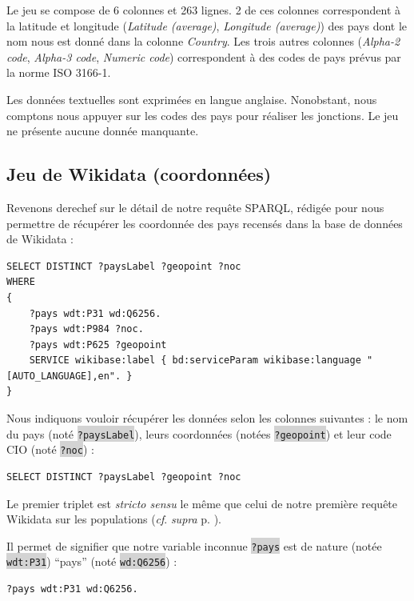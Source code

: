 \documentclass[hidelinks, 12pt]{report}
\newcommand{\code}[1]{\colorbox{LightGray}{\texttt{#1}}}
\begin{document}
Le jeu se compose de 6 colonnes et 263 lignes. 2 de ces colonnes correspondent à la latitude et longitude (\textit{Latitude (average)}, \textit{Longitude (average)}) des pays dont le nom nous est donné dans la colonne \textit{Country}. Les trois autres colonnes (\textit{Alpha-2 code}, \textit{Alpha-3 code}, \textit{Numeric code}) correspondent à des codes de pays prévus par la norme ISO 3166-1.

Les données textuelles sont exprimées en langue anglaise. Nonobstant, nous comptons nous appuyer sur les codes des pays pour réaliser les jonctions. Le jeu ne présente aucune donnée manquante. 





%





\subsection{Jeu de Wikidata (coordonnées)}

Revenons derechef sur le détail de notre requête SPARQL, rédigée pour nous permettre de récupérer les coordonnée des pays recensés dans la base de données de Wikidata :

\begin{lstlisting}[language=SPARQL]
SELECT DISTINCT ?paysLabel ?geopoint ?noc
WHERE 
{
	?pays wdt:P31 wd:Q6256.
	?pays wdt:P984 ?noc.
	?pays wdt:P625 ?geopoint
	SERVICE wikibase:label { bd:serviceParam wikibase:language "[AUTO_LANGUAGE],en". }
}
\end{lstlisting}

Nous indiquons vouloir récupérer les données selon les colonnes suivantes : le nom du pays (noté \code{?paysLabel}), leurs coordonnées (notées \code{?geopoint}) et leur code CIO (noté \code{?noc}) :

\begin{lstlisting}[language=SPARQL]
	SELECT DISTINCT ?paysLabel ?geopoint ?noc
\end{lstlisting}

Le premier triplet est \textit{stricto sensu} le même que celui de notre première requête Wikidata sur les populations (\textit{cf}. \textit{supra} p. \pageref{query1}).

Il permet de signifier que notre variable inconnue \code{?pays} est de nature (notée \code{wdt:P31}) \enquote{pays} (noté \code{wd:Q6256}) :

\begin{lstlisting}[language=SPARQL]
	?pays wdt:P31 wd:Q6256.
\end{lstlisting}
\end{document}

